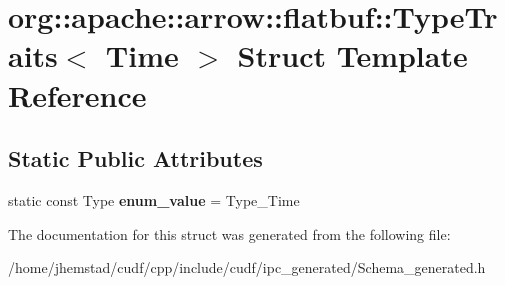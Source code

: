 \hypertarget{structorg_1_1apache_1_1arrow_1_1flatbuf_1_1TypeTraits_3_01Time_01_4}{}\section{org\+:\+:apache\+:\+:arrow\+:\+:flatbuf\+:\+:Type\+Traits$<$ Time $>$ Struct Template Reference}
\label{structorg_1_1apache_1_1arrow_1_1flatbuf_1_1TypeTraits_3_01Time_01_4}
\subsection*{Static Public Attributes}
\begin{DoxyCompactItemize}
\item 
static const Type {\bfseries enum\+\_\+value} = Type\+\_\+\+Time\hypertarget{structorg_1_1apache_1_1arrow_1_1flatbuf_1_1TypeTraits_3_01Time_01_4_aab8de2a8f2735d54a84ef164cc0b45a7}{}\label{structorg_1_1apache_1_1arrow_1_1flatbuf_1_1TypeTraits_3_01Time_01_4_aab8de2a8f2735d54a84ef164cc0b45a7}

\end{DoxyCompactItemize}


The documentation for this struct was generated from the following file\+:\begin{DoxyCompactItemize}
\item 
/home/jhemstad/cudf/cpp/include/cudf/ipc\+\_\+generated/Schema\+\_\+generated.\+h\end{DoxyCompactItemize}
